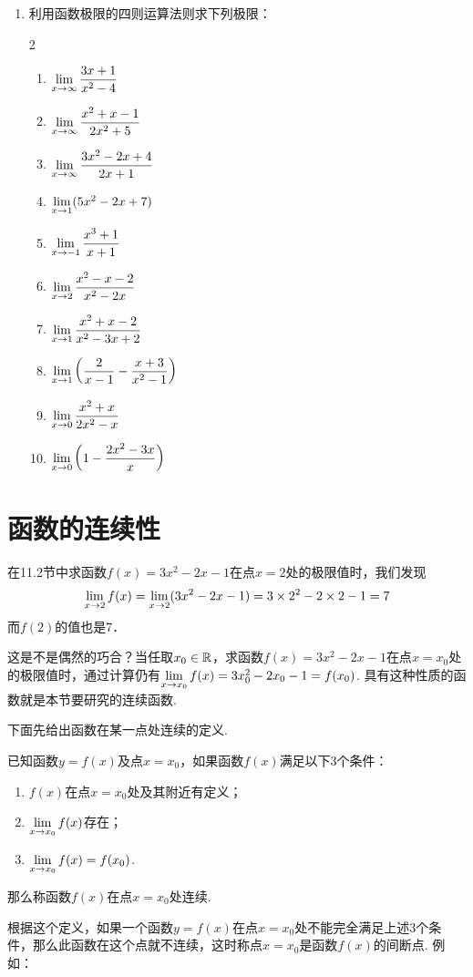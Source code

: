 \begin{enumerate}
\item 利用函数极限的四则运算法则求下列极限：
\begin{multicols}{2}
\begin{enumerate}[(1)]
    \item $\lim\limits_{x\to \infty}\dfrac{3x+1}{x^2-4}$
    \item $\lim\limits_{x\to \infty}\dfrac{x^2+x-1}{2x^2+5}$
    \item $\lim\limits_{x\to \infty}\dfrac{3x^2-2x+4}{2x+1}$
    \item $\lim\limits_{x\to 1}(5x^2-2x+7)$
    \item $\lim\limits_{x\to -1}\dfrac{x^3+1}{x+1}$
    \item $\lim\limits_{x\to 2}\dfrac{x^2-x-2}{x^2-2x}$
    \item $\lim\limits_{x\to 1}\dfrac{x^2+x-2}{x^2-3x+2}$
    \item $\lim\limits_{x\to 1}\left(\dfrac{2}{x-1}-\dfrac{x+3}{x^2-1}\right)$
    \item $\lim\limits_{x\to 0}\dfrac{x^2+x}{2x^2-x}$
    \item $\lim\limits_{x\to 0}\left(1-\dfrac{2x^2-3x}{x}\right)$
\end{enumerate}
\end{multicols}
\end{enumerate}

\section{函数的连续性}
在11.2节中求函数$f(x)=3x^2-2x-1$在点$x=2$处的极限值时，我们发现
\[\lim_{x\to 2}f(x)=\lim_{x\to 2}(3x^2-2x-1)=3\times2^2-2\times2-1=7\]
而$f(2)$的值也是7．

这是不是偶然的巧合？当任取$x_0\in\mathbb{R}$，求函数$f(x)=3x^2-2x-1$在点$x=x_0$处的极限值时，通过计算仍有$\lim\limits_{x\to x_0}f(x)=3x^2_0-2x_0-1=f(x_0)$. 具有这种性质的函数就是本节要研究的连续函数.

下面先给出函数在某一点处连续的定义.

已知函数$y=f(x)$及点$x=x_0$，如果函数$f(x)$满足以下3个条件：
\begin{enumerate}
\item $f(x)$在点$x=x_0$处及其附近有定义；
\item $\lim\limits_{x\to x_0}f(x)$存在；
\item $\lim\limits_{x\to x_0}f(x)=f(x_0)$.
\end{enumerate}

那么称函数$f(x)$在点$x=x_0$处连续.

根据这个定义，如果一个函数$y=f(x)$在点$x=x_0$处不能完全满足上述3个条件，那么此函数在这个点就不连续，这时称点$x=x_0$是函数$f(x)$的间断点. 例如：

